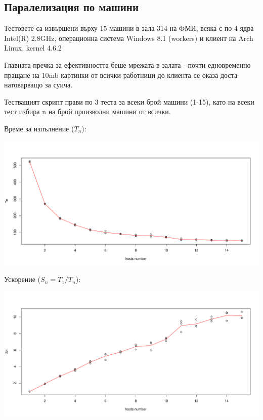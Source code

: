 \documentclass[12pt]{extarticle}
\begin{document}
\subsection{Паралелизация по машини}
Тестовете са извършени върху 15 машини в зала 314 на ФМИ,
всяка с по 4 ядра Intel(R) 2.8GHz, операционна система Windows 8.1
(workers) и клиент на Arch Linux, kernel 4.6.2

Главната пречка за ефективността беше мрежата в залата - почти
едновременно пращане на 10mb картинки от всички работници до клиента
се оказа доста натоварващо за суича.

Тестващият скрипт прави по 3 теста за всеки брой машини (1-15),
като на всеки тест избира n на брой произволни машини от всички.

\vspace{5mm}
Време за изпълнение ($T_n$):
\begin{center}
\includegraphics[width=\textwidth]{host_graphs/Tn.pdf}
\end{center}

Ускорение ($S_n = T_1 / T_n$):
\begin{center}
\includegraphics[width=\textwidth]{host_graphs/Sn.pdf}
\end{center}
\end{document}
